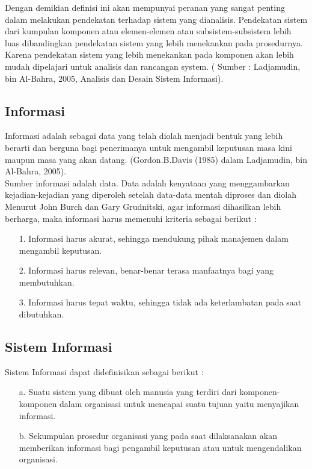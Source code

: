 \documentclass{jtetiproposalskripsi}
\begin{document}
Dengan demikian definisi ini akan mempunyai peranan yang sangat penting dalam melakukan pendekatan terhadap sistem yang dianalisis. Pendekatan sistem dari kumpulan komponen atau elemen-elemen atau subsistem-subsistem lebih luas dibandingkan pendekatan sistem yang lebih menekankan pada prosedurnya. Karena pendekatan sistem yang lebih menekankan pada komponen akan lebih mudah dipelajari untuk analisis dan rancangan system. 
           ( Sumber : Ladjamudin, bin Al-Bahra, 2005, Analisis dan Desain Sistem Informasi).

\subsection{Informasi}
Informasi adalah sebagai data yang telah diolah menjadi bentuk yang lebih berarti dan berguna bagi penerimanya untuk mengambil keputusan masa kini maupun masa yang akan datang. (Gordon.B.Davis (1985) dalam Ladjamudin, bin Al-Bahra, 2005).
\\

Sumber informasi adalah data. Data adalah kenyataan yang menggambarkan kejadian-kejadian yang diperoleh setelah data-data mentah diproses dan diolah 
\\

Menurut John Burch dan Gary Grudnitski, agar informasi dihasilkan lebih berharga, maka informasi harus memenuhi kriteria sebagai berikut :
\begin{itemize}

\item[1.]	Informasi harus akurat, sehingga mendukung pihak manajemen dalam mengambil keputusan.
\item[2.]	Informasi harus relevan, benar-benar terasa manfaatnya bagi yang membutuhkan.
\item[3.]	Informasi harus tepat waktu, sehingga tidak ada keterlambatan pada saat dibutuhkan.
\end{itemize}

\subsection{Sistem Informasi}
Sistem Informasi dapat didefinisikan sebagai berikut :
\begin{itemize}

\item[a.]	Suatu sistem yang dibuat oleh manusia yang terdiri dari komponen-komponen dalam organisasi untuk mencapai suatu tujuan yaitu menyajikan informasi.
\item[b.]	Sekumpulan prosedur organisasi yang pada saat dilaksanakan akan memberikan informasi bagi pengambil keputusan atau untuk mengendalikan organisasi.
\end{itemize}
\end{document}

